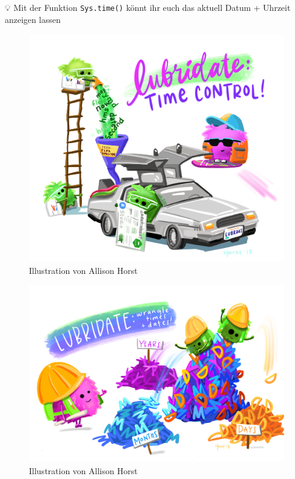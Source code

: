 \documentclass[
]{article}
\begin{document}
💡 Mit der Funktion \texttt{Sys.time()} könnt ihr euch das aktuell Datum + Uhrzeit anzeigen lassen

\begin{figure}

{\centering \includegraphics[width=1\linewidth]{images/035} 

}

\caption{Illustration von Allison Horst}\label{fig:unnamed-chunk-117}
\end{figure}

\begin{figure}

{\centering \includegraphics[width=1\linewidth]{images/036} 

}

\caption{Illustration von Allison Horst}\label{fig:unnamed-chunk-118}
\end{figure}
\end{document}
